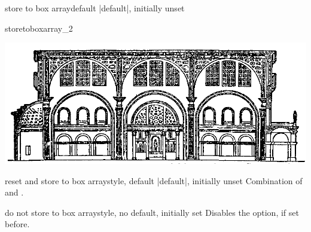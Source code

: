 \begin{docTcbKey}[][doc new=2015-07-13]{store to box array}{}{default |default|, initially unset}
\begin{exdispExample}{storetoboxarray_2}
\begin{tcolorbox}[blanker,width=4cm,
  fontupper=\footnotesize,
  enforce breakable,%
  break at=4cm,
  height fixed for=all,
  watermark text=\arabic{tcbbreakpart},
  reset box array,
  store to box array
  ]
\includegraphics[width=\linewidth]{Basilica_5.png}\par
\lipsum[1-2]
\end{tcolorbox}

\begin{tcbitemize}[raster columns=3,raster equal height,
  size=small,halign=center,sharp corners,colback=blue!5]
\tcbitem{}
\tcbitem{}
\tcbitem{}
\tcbitem{}
\tcbitem{}
\tcbitem{}
\end{tcbitemize}
\end{exdispExample}
\end{docTcbKey}


\begin{docTcbKey}[][doc new=2015-07-13]{reset and store to box array}{}{style, default |default|, initially unset}
  Combination of  and .
\end{docTcbKey}



\begin{docTcbKey}[][doc new=2015-07-13]{do not store to box array}{}{style, no default, initially set}
Disables the  option, if set before.
\end{docTcbKey}


